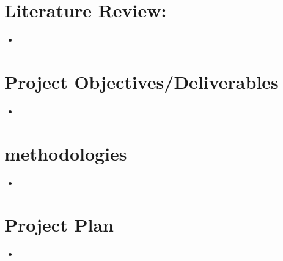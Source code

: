 \documentclass[a4paper]{article}
\begin{document}
\section{Literature Review:}

\begin{itemize}
    \item
\end{itemize}

\section{Project Objectives/Deliverables}

\begin{itemize}
    \item 
\end{itemize}

\section{methodologies}

\begin{itemize}
    \item 
\end{itemize}

\section{Project Plan}

\begin{itemize}
    \item 
\end{itemize}
\end{document}
